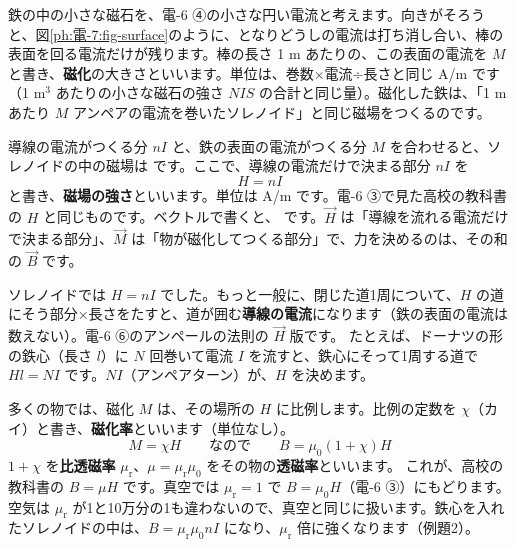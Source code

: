 \noindent 鉄の中の小さな磁石を、電-6 ④の小さな円い電流と考えます。向きがそろうと、図\ref{ph:電-7:fig-surface}のように、となりどうしの電流は打ち消し合い、棒の表面を回る電流だけが残ります。棒の長さ 1 m あたりの、この表面の電流を $M$ と書き、\textbf{磁化}の大きさといいます。単位は、巻数×電流÷長さと同じ A/m です（1 m$^3$ あたりの小さな磁石の強さ $NIS$ の合計と同じ量）。磁化した鉄は、「1 m あたり $M$ アンペアの電流を巻いたソレノイド」と同じ磁場をつくるのです。

導線の電流がつくる分 $nI$ と、鉄の表面の電流がつくる分 $M$ を合わせると、ソレノイドの中の磁場は
です。ここで、導線の電流だけで決まる部分 $nI$ を
\[H=nI\]
と書き、\textbf{磁場の強さ}といいます。単位は A/m です。電-6 ③で見た高校の教科書の $H$ と同じものです。ベクトルで書くと、
\label{ph:電-7:BHM}です。$\vec H$ は「導線を流れる電流だけで決まる部分」、$\vec M$ は「物が磁化してつくる部分」で、力を決めるのは、その和の $\vec B$ です。

ソレノイドでは $H=nI$ でした。もっと一般に、閉じた道1周について、$H$ の道にそう部分×長さをたすと、道が囲む\textbf{導線の電流}になります（鉄の表面の電流は数えない）。電-6 ⑥のアンペールの法則の $\vec H$ 版です。
たとえば、ドーナツの形の鉄心（長さ $l$）に $N$ 回巻いて電流 $I$ を流すと、鉄心にそって1周する道で $Hl=NI$ です。$NI$（アンペアターン）が、$H$ を決めます。

多くの物では、磁化 $M$ は、その場所の $H$ に比例します。比例の定数を $\chi$（カイ）と書き、\textbf{磁化率}といいます（単位なし）。
\[M=\chi H\qquad\text{なので}\qquad B=\mu_0(1+\chi)H\]
$1+\chi$ を\textbf{比透磁率} $\mu_{\mathrm r}$、$\mu=\mu_{\mathrm r}\mu_0$ をその物の\textbf{透磁率}といいます。
\label{ph:電-7:bmuh}これが、高校の教科書の $B=\mu H$ です。真空では $\mu_{\mathrm r}=1$ で $B=\mu_0H$（電-6 ③）にもどります。空気は $\mu_{\mathrm r}$ が1と10万分の1も違わないので、真空と同じに扱います。鉄心を入れたソレノイドの中は、$B=\mu_{\mathrm r}\mu_0nI$ になり、$\mu_{\mathrm r}$ 倍に強くなります（例題2）。

\begin{phflow}[物の中の磁場]
\end{phflow}

